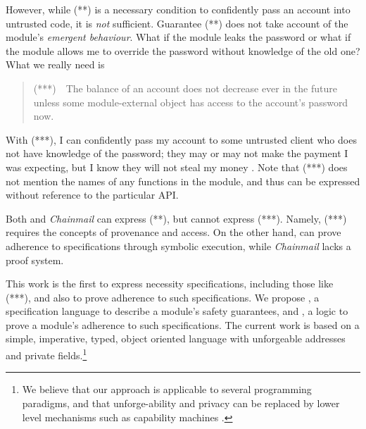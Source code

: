 
\vspace{.04in}

However, while (**) is a necessary condition  to confidently pass 
 an account into untrusted code, it is \emph{not} sufficient.
Guarantee (**) does not take  account of the module's \emph{emergent behaviour}.
 What if the module leaks the password or what if the module allows me to override the
 password without knowledge of the old one? 
 What we really need is
 \begin{quote}
(***)\  \ The balance of an account does not decrease ever in the future unless some module-external 
object has access to the account's password now.
\end{quote}
With (***), I can confidently pass my account to some untrusted client who
  does not have
 knowledge of the password; they may or may not make the payment I was expecting, but I
 know they will not steal my money \cite{ooToSecurity,miller-esop2013}.
 Note that (***)  does not mention
 the names of any functions in the module, and 
 thus can be expressed without reference to the particular API. 
 

  Both {} and  \emph{Chainmail} can express (**), but {}  cannot express (***). 
  Namely, (***)  requires the concepts of provenance and access.
 On the other hand, {} can prove adherence to  specifications through symbolic 
  execution, while  \emph{Chainmail}   lacks a proof system. 
  
\vspace{.04in}

This work is  the first to express necessity specifications, including those like (***), and 
also to prove adherence to such specifications.
We propose \Chainmail, a specification language %
 to describe a module's safety guarantees,
and 
\Chainlogic,   %
a logic to prove a module's adherence to such specifications.
The current work is based on a simple, imperative, typed, object oriented
language with unforgeable addresses and private fields.\footnote{We believe
 that our approach is applicable to several programming paradigms, and 
 that   unforge-ability and privacy
 can be replaced 
 by lower level mechanisms such as capability machines \cite{vanproving,davis2019cheriabi}.
  }


